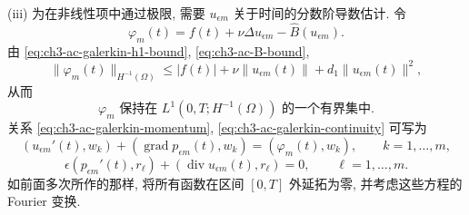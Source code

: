 \begin{Proof}
(iii) 为在非线性项中通过极限, 需要 $u_{\epsilon m}$ 关于时间的分数阶导数估计. 令
\[
\varphi_m(t)=f(t)+\nu\Delta u_{\epsilon m}-\widehat B(u_{\epsilon m}).
\]
由 \eqref{eq:ch3-ac-galerkin-h1-bound}, \eqref{eq:ch3-ac-B-bound},
\begin{equation}
\lVert\varphi_m(t)\rVert_{H^{-1}(\Omega)}
\leq|f(t)|+\nu\lVert u_{\epsilon m}(t)\rVert
+d_1\lVert u_{\epsilon m}(t)\rVert^2,
\label{eq:ch3-ac-galerkin-phi-bound}
\end{equation}
从而
\begin{equation}
\varphi_m\text{ 保持在 }L^1(0,T;H^{-1}(\Omega))\text{ 的一个有界集中}.
\label{eq:ch3-ac-galerkin-phi-bounded}
\end{equation}
关系 \eqref{eq:ch3-ac-galerkin-momentum}, \eqref{eq:ch3-ac-galerkin-continuity} 可写为
\[
(u_{\epsilon m}'(t),w_k)
+(\operatorname{grad}p_{\epsilon m}(t),w_k)
=(\varphi_m(t),w_k),
\qquad k=1,\ldots,m,
\]
\[
\epsilon(p_{\epsilon m}'(t),r_\ell)
+(\operatorname{div}u_{\epsilon m}(t),r_\ell)=0,
\qquad\ell=1,\ldots,m.
\]
如前面多次所作的那样, 将所有函数在区间 $[0,T]$ 外延拓为零, 并考虑这些方程的 Fourier 变换.


\end{Proof}
